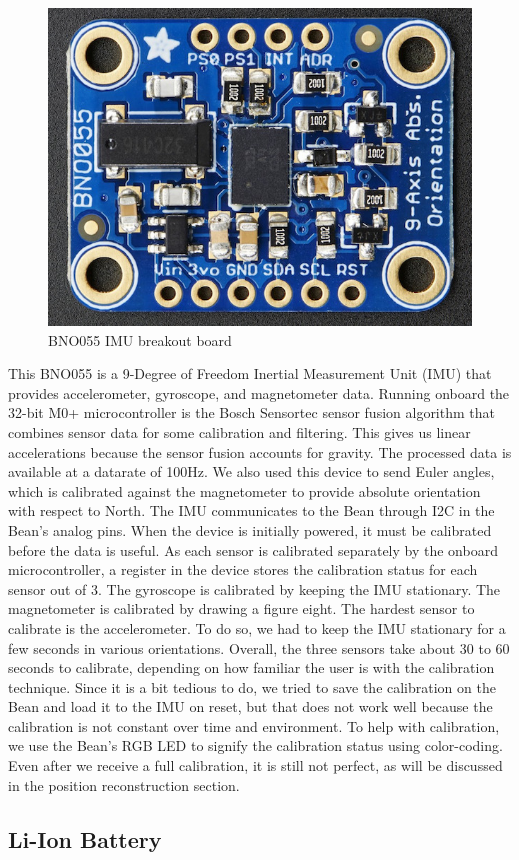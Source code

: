 \documentclass[12pt,journal]{IEEEtran}
\begin{document}
\begin{figure}[H]
  \centering
    \includegraphics[width=0.6\linewidth]{figures/imu}
  \caption{BNO055 IMU breakout board}
  \label{fig:imu}
\end{figure}
	This BNO055 is a 9-Degree of Freedom Inertial Measurement Unit (IMU) that provides accelerometer, gyroscope, and magnetometer data. Running onboard the 32-bit M0+ microcontroller is the Bosch Sensortec sensor fusion algorithm that combines sensor data for some calibration and filtering. This gives us linear accelerations because the sensor fusion accounts for gravity. The processed data is available at a datarate of 100Hz. We also used this device to send Euler angles, which is calibrated against the magnetometer to provide absolute orientation with respect to North. The IMU communicates to the Bean through I2C in the Bean’s analog pins.
	When the device is initially powered, it must be calibrated before the data is useful. As each sensor is calibrated separately by the onboard microcontroller, a register in the device stores the calibration status for each sensor out of 3. The gyroscope is calibrated by keeping the IMU stationary. The magnetometer is calibrated by drawing a figure eight. The hardest sensor to calibrate is the accelerometer. To do so, we had to keep the IMU stationary for a few seconds in various orientations. Overall, the three sensors take about 30 to 60 seconds to calibrate, depending on how familiar the user is with the calibration technique. Since it is a bit tedious to do, we tried to save the calibration on the Bean and load it to the IMU on reset, but that does not work well because the calibration is not constant over time and environment. To help with calibration, we use the Bean’s RGB LED to signify the calibration status using color-coding. Even after we receive a full calibration, it is still not perfect, as will be discussed in the position reconstruction section.

\subsection{Li-Ion Battery}
\end{document}
